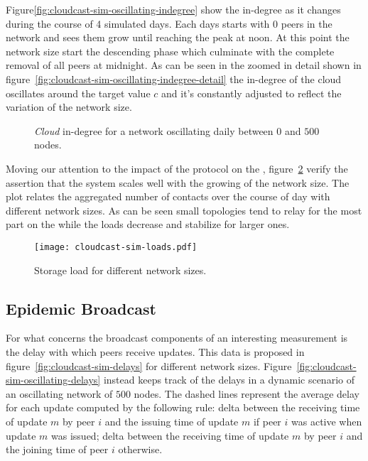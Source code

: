Figure\ref{fig:cloudcast-sim-oscillating-indegree} show the
\cloud in-degree as it changes during the course of 4 simulated
days. Each days starts with 0 peers in the network and sees them grow
until reaching the peak at noon. At this point the network size start
the descending phase which culminate with the complete removal of all
peers at midnight. As can be seen in the zoomed in detail shown in
figure~\ref{fig:cloudcast-sim-oscillating-indegree-detail} the
in-degree of the cloud oscillates around the target value $c$ and it's
constantly adjusted to reflect the variation of the network size.

\begin{figure}[H]
  \centering
  \caption{\emph{Cloud} in-degree for a network oscillating daily
    between $0$ and $500$ nodes.}
  \label{fig:cloudcast-sim-oscillating-indegree-global}
\end{figure}

Moving our attention to the impact of the \peersampling protocol on
the \cloud, figure~\ref{fig:cloudcast-sim-loads} verify the assertion
that the system scales well with the growing of the network size. The
plot relates the aggregated number of \cloud contacts over the course
of day with different network sizes. As can be seen small topologies
tend to relay for the most part on the \cloud while the loads
decrease and stabilize for  larger ones.

\begin{figure}[H]
  \centering
  \texttt{[image: cloudcast-sim-loads.pdf]}
  \caption{Storage \cloud load for different network sizes.}
  \label{fig:cloudcast-sim-loads}
\end{figure}

\subsection{Epidemic Broadcast}
For what concerns the \epidemic broadcast components of
\cloudcast an interesting measurement is the delay with which peers
receive updates. This data is proposed in
figure~\ref{fig:cloudcast-sim-delays} for different network sizes.
Figure~\ref{fig:cloudcast-sim-oscillating-delays} instead keeps track
of the delays in a dynamic scenario of an oscillating network of
$500$ nodes. The dashed lines represent the average delay for each
update computed by the following rule: delta between the receiving
time of update $m$ by peer $i$ and the issuing time of update $m$ if
peer $i$ was active when update $m$ was issued; delta between the
receiving time of update $m$ by peer $i$ and the joining time of peer
$i$ otherwise.

